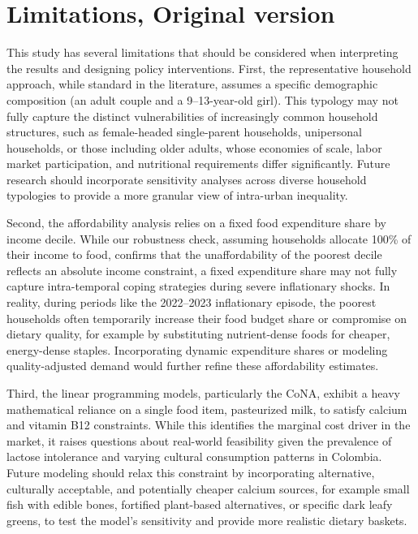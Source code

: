 \documentclass[Afour, sageh,times]{sagej}
\begin{document}
\section*{Limitations, Original version}

This study has several limitations that should be considered when interpreting the results and designing policy interventions. First, the representative household approach, while standard in the literature, assumes a specific demographic composition (an adult couple and a 9--13-year-old girl). This typology may not fully capture the distinct vulnerabilities of increasingly common household structures, such as female-headed single-parent households, unipersonal households, or those including older adults, whose economies of scale, labor market participation, and nutritional requirements differ significantly. Future research should incorporate sensitivity analyses across diverse household typologies to provide a more granular view of intra-urban inequality.

Second, the affordability analysis relies on a fixed food expenditure share by income decile. While our robustness check, assuming households allocate 100\% of their income to food, confirms that the unaffordability of the poorest decile reflects an absolute income constraint, a fixed expenditure share may not fully capture intra-temporal coping strategies during severe inflationary shocks. In reality, during periods like the 2022--2023 inflationary episode, the poorest households often temporarily increase their food budget share or compromise on dietary quality, for example by substituting nutrient-dense foods for cheaper, energy-dense staples. Incorporating dynamic expenditure shares or modeling quality-adjusted demand would further refine these affordability estimates.

Third, the linear programming models, particularly the CoNA, exhibit a heavy mathematical reliance on a single food item, pasteurized milk, to satisfy calcium and vitamin B12 constraints. While this identifies the marginal cost driver in the market, it raises questions about real-world feasibility given the prevalence of lactose intolerance and varying cultural consumption patterns in Colombia. Future modeling should relax this constraint by incorporating alternative, culturally acceptable, and potentially cheaper calcium sources, for example small fish with edible bones, fortified plant-based alternatives, or specific dark leafy greens, to test the model's sensitivity and provide more realistic dietary baskets.
\end{document}

